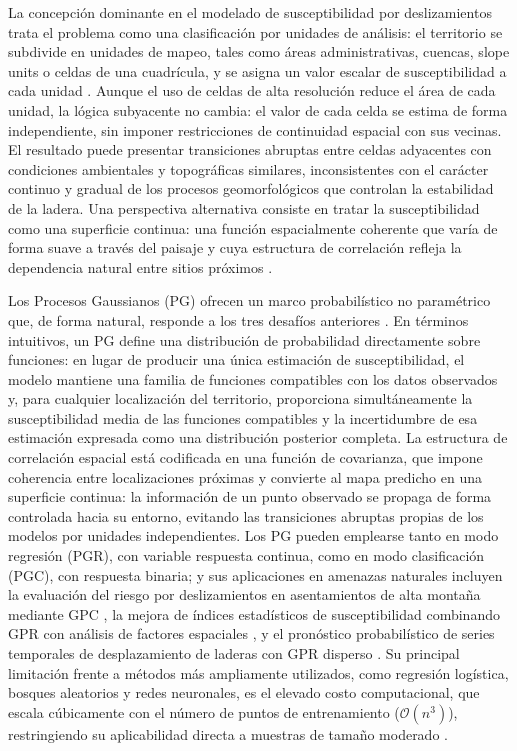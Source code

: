 \documentclass[letterpaper,11pt]{tec}
\begin{document}
{La concepción dominante en el modelado de susceptibilidad por deslizamientos trata el problema como una clasificación por unidades de análisis: el
territorio se subdivide en unidades de mapeo, tales como áreas administrativas, cuencas, slope units o celdas de una
cuadrícula, y se asigna un valor escalar de susceptibilidad a cada unidad \citep{Guzzetti2005, Reichenbach2018}. Aunque el uso
de celdas de alta resolución reduce el área de cada unidad, la lógica subyacente no cambia: el valor de cada celda se estima de
forma independiente, sin imponer restricciones de continuidad espacial con sus vecinas. El resultado puede presentar transiciones
abruptas entre celdas adyacentes con condiciones ambientales y topográficas similares, inconsistentes con el carácter continuo y
gradual de los procesos geomorfológicos que controlan la estabilidad de la ladera. Una perspectiva alternativa consiste en tratar la
susceptibilidad como una superficie continua: una función espacialmente coherente que varía de forma suave a través del
paisaje y cuya estructura de correlación refleja la dependencia natural entre sitios próximos \citep{Lombardo2020}.

Los Procesos Gaussianos (PG) ofrecen un marco probabilístico no paramétrico que, de forma natural, responde a los tres desafíos
anteriores \citep{Rasmussen2006}. En términos intuitivos, un PG define una distribución de probabilidad directamente sobre
funciones: en lugar de producir una única estimación de susceptibilidad, el modelo mantiene una familia de funciones compatibles
con los datos observados y, para cualquier localización del territorio, proporciona simultáneamente la susceptibilidad media de las 
funciones compatibles y la incertidumbre de esa estimación expresada como una distribución posterior completa. La estructura de 
correlación espacial está codificada en una función de covarianza, que impone coherencia entre localizaciones próximas y convierte al mapa
predicho en una superficie continua: la información de un punto observado se propaga de forma controlada hacia su entorno,
evitando las transiciones abruptas propias de los modelos por unidades independientes. Los PG pueden emplearse tanto en modo
regresión (PGR), con variable respuesta continua, como en modo clasificación (PGC), con respuesta binaria; y sus aplicaciones
en amenazas naturales incluyen la evaluación del riesgo por deslizamientos en asentamientos de alta montaña mediante GPC
\citep{Gao2021}, la mejora de índices estadísticos de susceptibilidad combinando GPR con análisis de factores espaciales
\citep{Cheng2022}, y el pronóstico probabilístico de series temporales de desplazamiento de laderas con GPR disperso
\citep{Yang2022}. Su principal limitación frente a métodos más ampliamente utilizados, como regresión logística,
bosques aleatorios y redes neuronales, es el elevado costo computacional, que escala cúbicamente con el número de puntos de
entrenamiento ($\mathcal{O}(n^3)$), restringiendo su aplicabilidad directa a muestras de tamaño moderado \citep{Rasmussen2006}.

}
\end{document}
